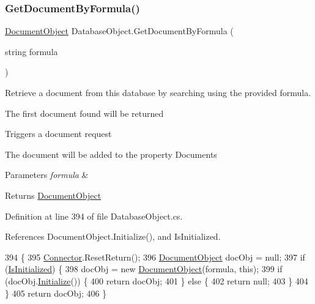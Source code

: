\subsubsection{\texorpdfstring{Get\+Document\+By\+Formula()}{GetDocumentByFormula()}}
{\footnotesize\ttfamily \mbox{\hyperlink{class_document_object}{Document\+Object}} Database\+Object.\+Get\+Document\+By\+Formula (\begin{DoxyParamCaption}\item[{string}]{formula }\end{DoxyParamCaption})}



Retrieve a document from this database by searching using the provided formula. 

The first document found will be returned

Triggers a document request

The document will be added to the property \textquotesingle{}Documents\textquotesingle{}


\begin{DoxyParams}{Parameters}
{\em formula} & \\
\hline
\end{DoxyParams}
\begin{DoxyReturn}{Returns}
\mbox{\hyperlink{class_document_object}{Document\+Object}}
\end{DoxyReturn}


Definition at line 394 of file Database\+Object.\+cs.



References Document\+Object.\+Initialize(), and Is\+Initialized.


\begin{DoxyCode}
394                                                                \{
395         \mbox{\hyperlink{class_connector}{Connector}}.ResetReturn();
396         \mbox{\hyperlink{class_document_object}{DocumentObject}} docObj = null;
397         \textcolor{keywordflow}{if} (\mbox{\hyperlink{class_database_object_a5fe036d32a30eb10d1b3f6a30263f740}{IsInitialized}}) \{
398             docObj = \textcolor{keyword}{new} \mbox{\hyperlink{class_document_object}{DocumentObject}}(formula, \textcolor{keyword}{this});
399             \textcolor{keywordflow}{if} (docObj.\mbox{\hyperlink{class_document_object_af4298d6cfbb9ea60643d9995309b73f1}{Initialize}}()) \{
400                 \textcolor{keywordflow}{return} docObj;
401             \} \textcolor{keywordflow}{else} \{
402                 \textcolor{keywordflow}{return} null;
403             \}
404         \}
405         \textcolor{keywordflow}{return} docObj;
406     \}
\end{DoxyCode}
\mbox{\label{class_database_object_a57bfc77d2754236cbcf6ac30a90da529}} 
